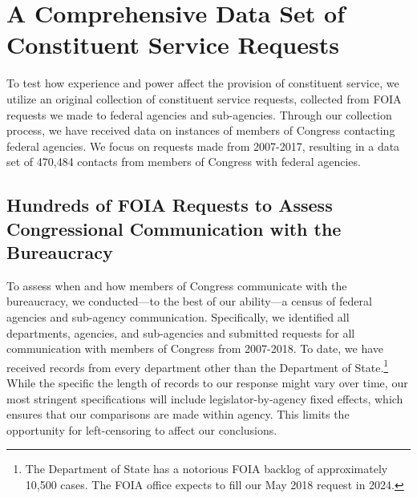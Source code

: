 \documentclass[12pt]{article}
\begin{document}
\section{A Comprehensive Data Set of Constituent Service Requests} \label{s:data}
To test how experience and power affect the provision of constituent service, we utilize an original collection of constituent service requests, collected from  FOIA requests we made to federal agencies and sub-agencies.  Through our collection process, we have received data on  instances of members of Congress contacting federal agencies.  We focus on requests made from 2007-2017, resulting in a data set of 470,484 contacts from members of Congress with federal agencies.   

\subsection{Hundreds of FOIA Requests to Assess Congressional Communication with the Bureaucracy}
To assess when and how members of Congress communicate with the bureaucracy, we conducted---to the best of our ability---a census of federal agencies and sub-agency communication.  Specifically, we identified all departments, agencies, and sub-agencies and submitted requests for all communication with members of Congress from 2007-2018.  To date, we have received records from every department other than the Department of State.\footnote{The Department of State has a notorious FOIA backlog of approximately 10,500 cases. The FOIA office expects to fill our May 2018 request in 2024.}  While the specific the length of records to our response might vary over time, our most stringent specifications will include legislator-by-agency fixed effects, which ensures that our comparisons are made within agency.  This limits the opportunity for left-censoring to affect our conclusions.  
\end{document}
